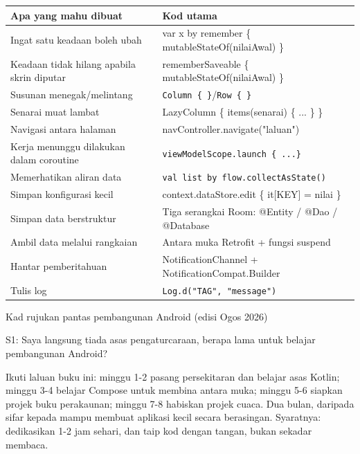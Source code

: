 


\begin{center}
\begin{tabularx}{\linewidth}{|X|X|}
\hline
\textbf{Apa yang mahu dibuat} & \textbf{Kod utama} \tabularnewline
\hline
Ingat satu keadaan boleh ubah & var x by remember \{ mutableStateOf(nilaiAwal) \} \tabularnewline
Keadaan tidak hilang apabila skrin diputar & rememberSaveable \{ mutableStateOf(nilaiAwal) \} \tabularnewline
Susunan menegak/melintang & \texttt{Column \{ \}}/\texttt{Row \{ \}} \tabularnewline
Senarai muat lambat & LazyColumn \{ items(senarai) \{ ... \} \} \tabularnewline
Navigasi antara halaman & navController.navigate("laluan") \tabularnewline
Kerja menunggu dilakukan dalam coroutine & \texttt{viewModelScope.\allowbreak launch \{ .\allowbreak .\allowbreak .\allowbreak  \}} \tabularnewline
Memerhatikan aliran data & \texttt{val list by flow.\allowbreak collectAsState()} \tabularnewline
Simpan konfigurasi kecil & context.dataStore.edit \{ it[KEY] = nilai \} \tabularnewline
Simpan data berstruktur & Tiga serangkai Room: @Entity / @Dao / @Database \tabularnewline
Ambil data melalui rangkaian & Antara muka Retrofit + fungsi suspend \tabularnewline
Hantar pemberitahuan & NotificationChannel + NotificationCompat.Builder \tabularnewline
Tulis log & \texttt{Log.\allowbreak d("TAG", "message")} \tabularnewline
\hline
\end{tabularx}
\end{center}

\begin{center}\small\color{gray}Kad rujukan pantas pembangunan Android (edisi Ogos 2026)\end{center}


S1: Saya langsung tiada asas pengaturcaraan, berapa lama untuk belajar pembangunan Android?

Ikuti laluan buku ini: minggu 1-2 pasang persekitaran dan belajar asas Kotlin; minggu 3-4 belajar Compose untuk membina antara muka; minggu 5-6 siapkan projek buku perakaunan; minggu 7-8 habiskan projek cuaca. Dua bulan, daripada sifar kepada mampu membuat aplikasi kecil secara berasingan. Syaratnya: dedikasikan 1-2 jam sehari, dan taip kod dengan tangan, bukan sekadar membaca.

